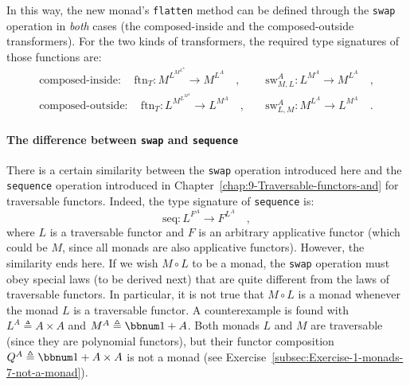 In this way, the new monad\textsf{'}s \texttt{}\lstinline!flatten! method
can be defined through the \texttt{}\lstinline!swap! operation in
\emph{both} cases (the composed-inside and the composed-outside transformers).
For the two kinds of transformers, the required type signatures of
those functions are:
\begin{align*}
\text{composed-inside}:\quad\text{ftn}_{T}:M^{L^{M^{L^{A}}}}\rightarrow M^{L^{A}}\quad, & \quad\text{sw}_{M,L}^{A}:L^{M^{A}}\rightarrow M^{L^{A}}\quad,\\
\text{composed-outside}:\quad\text{ftn}_{T}:L^{M^{L^{M^{A}}}}\rightarrow L^{M^{A}}\quad, & \quad\text{sw}_{L,M}^{A}:M^{L^{A}}\rightarrow L^{M^{A}}\quad.
\end{align*}


\paragraph{The difference between \texttt{swap} and \texttt{sequence}}

There is a certain similarity between the \texttt{}\lstinline!swap!
operation introduced here and the \lstinline!sequence! operation
introduced in Chapter~\ref{chap:9-Traversable-functors-and} for
traversable functors. Indeed, the type signature of \lstinline!sequence!
is:
\[
\text{seq}:L^{F^{A}}\rightarrow F^{L^{A}}\quad,
\]
where $L$ is a traversable functor and $F$ is an arbitrary applicative
functor (which could be $M$, since all monads are also applicative
functors). However, the similarity ends here. If we wish $M\circ L$
to be a monad, the \texttt{}\lstinline!swap! operation must obey
special laws (to be derived next) that are quite different from the
laws of traversable functors. In particular, it is not true that $M\circ L$
is a monad whenever the monad $L$ is a traversable functor. A counterexample
is found with $L^{A}\triangleq A\times A$ and $M^{A}\triangleq\bbnum 1+A$.
Both monads $L$ and $M$ are traversable (since they are polynomial
functors), but their functor composition $Q^{A}\triangleq\bbnum 1+A\times A$
is not a monad (see Exercise~\ref{subsec:Exercise-1-monads-7-not-a-monad}).

